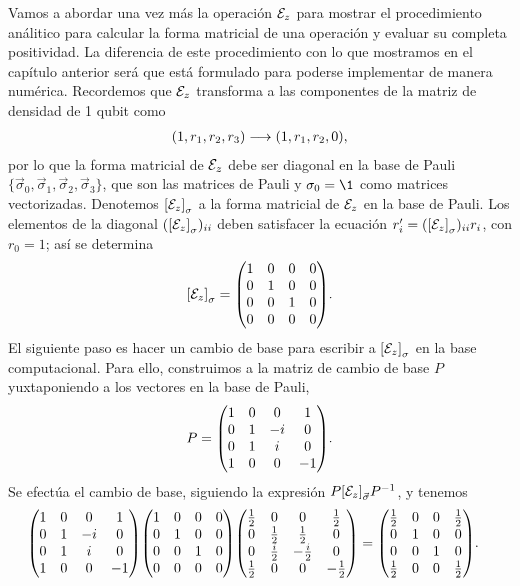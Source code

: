 Vamos a abordar una vez más la operación $\mathcal{E}_z$
para mostrar el procedimiento análitico para 
calcular la forma matricial de una operación 
y evaluar su completa positividad. La diferencia 
de este procedimiento con lo que mostramos en el
capítulo anterior será que está formulado para 
poderse implementar de manera numérica.
Recordemos que $\mathcal{E}_z$ transforma a las componentes 
de la matriz de densidad de 1 qubit como
\begin{align}
\qty(1,r_1,r_2,r_3)\longrightarrow\qty(1,r_1,r_2,0),
\end{align}
por lo que la forma matricial de $\mathcal{E}_z$ debe ser diagonal 
en la base de Pauli 
$\{ \vec{\sigma}_0,\vec{\sigma}_1,\vec{\sigma}_2,\vec{\sigma}_3\}$, 
que son las matrices de Pauli y $\sigma_0=\1$ como matrices vectorizadas.
Denotemos $\qty[\mathcal{E}_z]_{\sigma}$ a la forma matricial de
$\mathcal{E}_z$ en la base de Pauli. 
Los elementos de la diagonal $(\qty[\mathcal{E}_{z}]_{\sigma})_{ii}$ 
deben satisfacer la ecuación $r_i'=(\qty[\mathcal{E}_{z}]_{\sigma})_{ii}r_i$, 
con $r_0=1$; así se determina 
\begin{align}
\qty[\E_z]_{\sigma}=
\mqty(
 1 & 0 & 0 & 0 \\
 0 & 1 & 0 & 0 \\
 0 & 0 & 1 & 0 \\
 0 & 0 & 0 & 0 
).
\end{align}
El siguiente paso es hacer un cambio de base para escribir
a $\qty[\mathcal{E}_z]_{\sigma}$ en la base computacional.
Para ello, construimos a la matriz de cambio de base $P$
yuxtaponiendo a los vectores en la base de Pauli,
\begin{align}
P=\mqty(
 1 & 0 & 0 & 1 \\
 0 & 1 & -i & 0 \\
 0 & 1 & i & 0 \\
 1 & 0 & 0 & -1 
).
\end{align}
Se efectúa el cambio de base, siguiendo la expresión 
$P\qty[\mathcal{E}_z]_{\vec{\sigma}}P^{-1}$, y tenemos
\begin{align}
\mqty(
 1 & 0 & 0 & 1 \\
 0 & 1 & -i & 0 \\
 0 & 1 & i & 0 \\
 1 & 0 & 0 & -1 
)
\mqty(
 1 & 0 & 0 & 0 \\
 0 & 1 & 0 & 0 \\
 0 & 0 & 1 & 0 \\
 0 & 0 & 0 & 0 
)
\mqty(
 \frac{1}{2} & 0 & 0 & \frac{1}{2} \\
 0 & \frac{1}{2} & \frac{1}{2} & 0 \\
 0 & \frac{i}{2} & -\frac{i}{2} & 0 \\
 \frac{1}{2} & 0 & 0 & -\frac{1}{2} 
)
&=
\mqty(
 \frac{1}{2} & 0 & 0 & \frac{1}{2} \\
 0 & 1 & 0 & 0 \\
 0 & 0 & 1 & 0 \\
 \frac{1}{2} & 0 & 0 & \frac{1}{2} 
).
\end{align}
